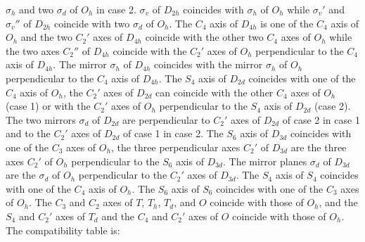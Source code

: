 \documentclass[12pt,a4paper]{article}
\begin{document}
$\sigma_h$ and two $\sigma_d$ of $O_h$ in case 2. $\sigma_v$ of $D_{2h}$
coincides with $\sigma_h$ of $O_h$ while $\sigma_v'$ and $\sigma_v''$
of $D_{2h}$ coincide with two $\sigma_d$ of $O_h$.
The $C_4$ axis of $D_{4h}$ is
one of the $C_4$ axis of $O_h$ and the two $C_2'$ axes of $D_{4h}$ coincide 
with the other two $C_4$ axes of $O_h$ while the two axes $C_2''$ of $D_{4h}$ 
coincide with the $C_2'$ axes of $O_h$ perpendicular to the $C_4$ axis of 
$D_{4h}$.
The mirror $\sigma_h$ of $D_{4h}$ coincides with the mirror $\sigma_h$ of
$O_h$ perpendicular to the $C_4$ axis of $D_{4h}$.
The $S_4$ axis of $D_{2d}$ coincides with one of the $C_4$ axis of $O_h$,
the $C_2'$ axes of $D_{2d}$ can coincide with the other $C_4$ axes of 
$O_h$ (case 1) or with the $C_2'$ axes of $O_h$ perpendicular to the $S_4$ 
axis of $D_{2d}$ (case 2). The two mirrors $\sigma_d$ of $D_{2d}$ are 
perpendicular to $C_2'$ axes of $D_{2d}$ of case 2 in case 1 and to the $C_2'$
axes of $D_{2d}$ of case 1 in case 2.
The $S_6$ axis of $D_{3d}$ coincides with one of the $C_3$ axes
of $O_h$, the three perpendicular axes $C_2'$ of $D_{3d}$ are the three axes 
$C_2'$ of $O_h$ perpendicular to the $S_6$ axis of $D_{3d}$. The mirror planes 
$\sigma_d$ of $D_{3d}$ are the $\sigma_d$ of $O_h$ perpendicular to the $C_2'$ 
axes of $D_{3d}$.
The $S_4$ axis of $S_4$ coincides with one of the $C_4$ axis of $O_h$. 
The $S_6$ axis of $S_6$ coincides with one of the $C_3$ axes of $O_h$. 
The $C_3$ and $C_2$ axes of $T$, $T_h$, $T_d$, and
$O$ coincide with those of $O_h$, and the $S_4$ and $C_2'$ axes of $T_d$ and
the $C_4$ and $C_2'$ axes of $O$ coincide with those of $O_h$. \\
The compatibility table is:
\end{document}
